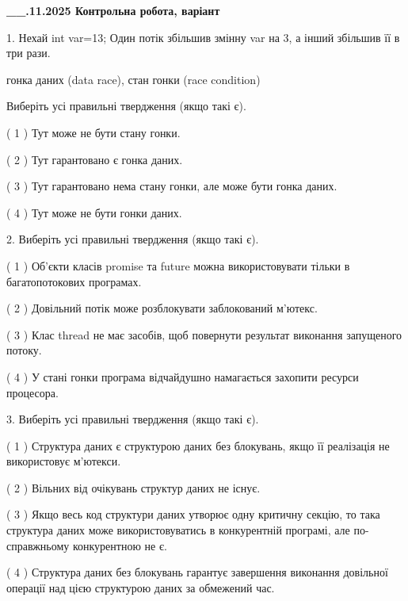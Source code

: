 \documentclass[12pt, ukrainian]{article}
\begin{document}
\newpage
\begin {large}

\textbf{\_\_.11.2025 Контрольна робота, варіант  }\par


{
1. Нехай int var=13; Один потік збільшив змінну var на 3, а інший збільшив її в три рази.

гонка даних (data race), стан гонки (race condition)

Виберіть усі правильні твердження (якщо такі є).\par
\vspace{2mm}
( 1 ) Тут може не бути стану гонки.%

( 2 ) Тут гарантовано є гонка даних.%

( 3 ) Тут гарантовано нема стану гонки, але може бути гонка даних.%

( 4 ) Тут може не бути гонки даних.%


2. Виберіть усі правильні твердження (якщо такі є).\par
\vspace{2mm}

( 1 ) Об’єкти класів promise та future можна використовувати тільки в багатопотокових програмах.%

( 2 ) Довільний потік може розблокувати заблокований м’ютекс.%

( 3 ) Клас thread не має засобів, щоб повернути результат виконання запущеного потоку.%

( 4 ) У стані гонки програма відчайдушно намагається захопити ресурси процесора.%


3. Виберіть усі правильні твердження (якщо такі є).\par
\vspace{2mm}

( 1 ) Структура даних є структурою даних без блокувань, якщо її реалізація не використовує м’ютекси.%

( 2 ) Вільних від очікувань структур даних не існує.%

( 3 ) Якщо весь код структури даних утворює одну критичну секцію, то така структура даних може використовуватись в конкурентній програмі, але по-справжньо\-му конкурентною не є.%

( 4 ) Структура даних без блокувань гарантує завершення виконання довільної операції над цією структурою даних за обмежений час.%


}
\end{large}
\end{document}
